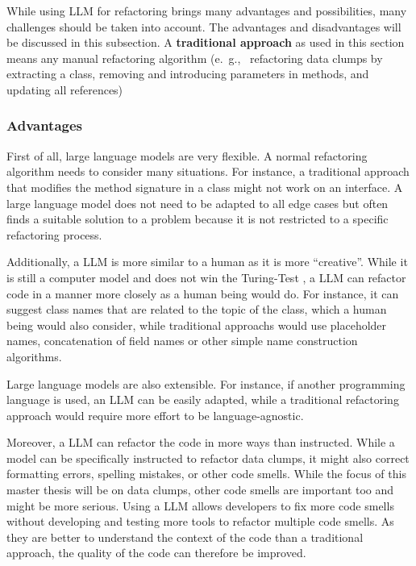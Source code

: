 While using  \ac{LLM} for refactoring brings many advantages  and possibilities, many challenges should be taken into account. The advantages and disadvantages will be discussed in this subsection. A \textbf{traditional approach} as used in this section means any manual refactoring algorithm (e.~g.,~ refactoring data clumps by extracting a class, removing and introducing parameters in methods, and updating all references)

\subsubsection{Advantages}

First of all, large language models are very flexible. A normal refactoring algorithm needs to consider many situations. For instance, a traditional approach that modifies the method signature in a class might not work on an interface. A large language model does not need to be adapted to all edge cases but often finds a suitable solution to a problem because it is not restricted to a specific refactoring process. \cite{shirafuji2023refactoring}

Additionally, a \ac{LLM} is more similar to a human as it is more  \enquote{creative}. While it is still a computer model and does not win the Turing-Test \cite{turing_test}, a \ac{LLM} can refactor code in a manner more closely as a human being would do. For instance, it can suggest class names that are related to the topic of the class, which a human being would also consider, while traditional approachs would use placeholder names, concatenation of field names or other simple name construction algorithms. \cite{shirafuji2023refactoring}

Large language models are also extensible. For instance, if another programming language is used, an \ac{LLM} can be easily adapted, while a traditional refactoring approach would require more effort to be language-agnostic.

Moreover, a \ac{LLM} can refactor the code in more ways than instructed. While a model can be specifically instructed to refactor data clumps, it might also correct formatting errors, spelling mistakes, or other code smells. While the focus of this master thesis will be on data clumps, other code smells are important too and might be more serious. Using a  \ac{LLM} allows developers to fix more code smells without developing and testing more tools to refactor multiple code smells. As they are better to understand the context of the code than a traditional approach, the quality of the code can therefore be improved. \cite{shirafuji2023refactoring}

